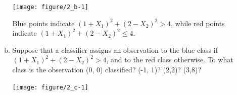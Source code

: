 \documentclass[12pt,fleqn]{article}\usepackage[]{graphicx}\usepackage[]{color}
\newenvironment{knitrout}{}{} %
\theoremstyle{definition}
\begin{document}
\begin{enumerate}[1.]
\begin{enumerate}[(a)]
\begin{knitrout}
{\centering \texttt{[image: figure/2\_b-1]} 

}



\end{knitrout}
        Blue points indicate $\left(1+X_{1}\right)^{2}+\left(2-X_{2}\right)^{2}>4$, while red points indicate $\left(1+X_{1}\right)^{2}+\left(2-X_{2}\right)^{2} \leq 4$.
          \item Suppose that a classifier assigns an observation to the blue class if $\left(1+X_{1}\right)^{2}+\left(2-X_{2}\right)^{2}>4$, and to the red class otherwise. To what class is the observation (0, 0) classified? (-1, 1)? (2,2)? (3,8)?\\
\begin{knitrout}
\color{fgcolor}

{\centering \texttt{[image: figure/2\_c-1]} 

}




\end{knitrout}
\end{enumerate}
\end{enumerate}
\end{document}
